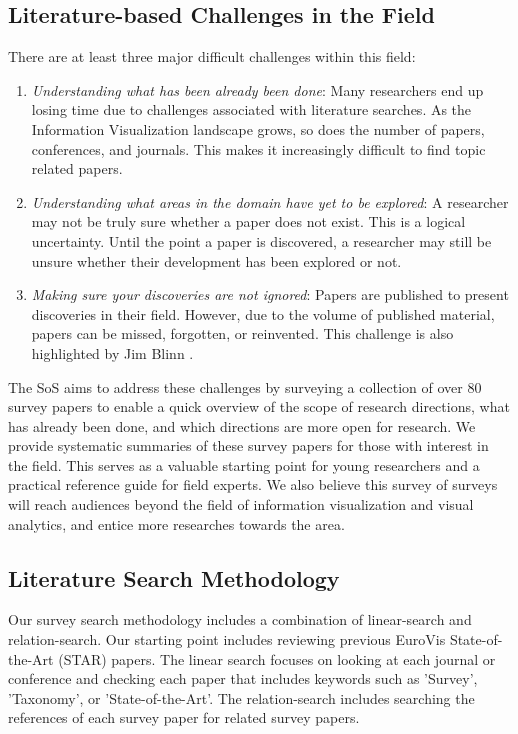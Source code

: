 \subsection{Literature-based Challenges in the Field}
There are at least three major difficult challenges within this field:
\begin{enumerate}
\item \textit{Understanding what has been already been done}: Many researchers end up losing time due to challenges associated with literature searches. As the Information Visualization landscape grows, so does the number of papers, conferences, and journals. This makes it increasingly difficult to find topic related papers. 
\item \textit{Understanding what areas in the domain have yet to be explored}: A researcher may not be truly sure whether a paper does not exist. This is a logical uncertainty. Until the point a paper is discovered, a researcher may still be unsure whether their development has been explored or not.
\item \textit{Making sure your discoveries are not ignored}: Papers are published to present discoveries in their field. However, due to the volume of published material, papers can be missed, forgotten, or reinvented. This challenge is also highlighted by Jim Blinn \cite{blinn1998ten}.
\end{enumerate}

The SoS aims to address these challenges by surveying a collection of over 80 survey papers to enable a quick overview of the scope of research directions, what has already been done, and which directions are more open for research. We provide systematic summaries of these survey papers for those with interest in the field. This serves as a valuable starting point for young researchers and a practical reference guide for field experts. We also believe this survey of surveys will reach audiences beyond the field of information visualization and visual analytics, and entice more researches towards the area.

\subsection{Literature Search Methodology}
Our survey search methodology includes a combination of linear-search and relation-search. Our starting point includes reviewing previous EuroVis State-of-the-Art (STAR) papers. The linear search focuses on looking at each journal or conference and checking each paper that includes keywords such as 'Survey', 'Taxonomy', or 'State-of-the-Art'. The relation-search includes searching the references of each survey paper for related survey papers. 

